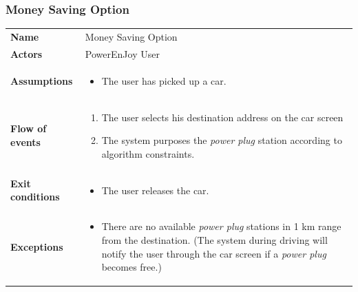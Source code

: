\documentclass[english]{article}
\newcommand{\powerplug}{\textit{power plug }}
\begin{document}
	\subsubsection{Money Saving Option}
	\begin{center}
	\begin{tabular}{l||p{10cm}}
	\textbf{Name} 
		& Money Saving Option\\ [8px]
	\textbf{Actors} 
		& PowerEnJoy User\\ [8px]
	\textbf{Assumptions} 
	& \begin{itemize}
		\item The user has picked up a car. 
	\end{itemize}\\
	\textbf{Flow of events}
		& \begin{enumerate}
 		\item The user selects his destination address on the car screen
		\item The system purposes the \powerplug station according to algorithm constraints.
		\end{enumerate}\\ 
	\textbf{Exit conditions}
		&\begin{itemize}
			\item The user releases the car.
		\end{itemize}\\
	\textbf{Exceptions}
		& \begin{itemize}
			\item There are no available \powerplug stations in 1 km range from the destination. (The system during driving will notify the user through the car screen if a \powerplug becomes free.)
		\end{itemize}
	\end{tabular}
	\end{center}
\end{document}
